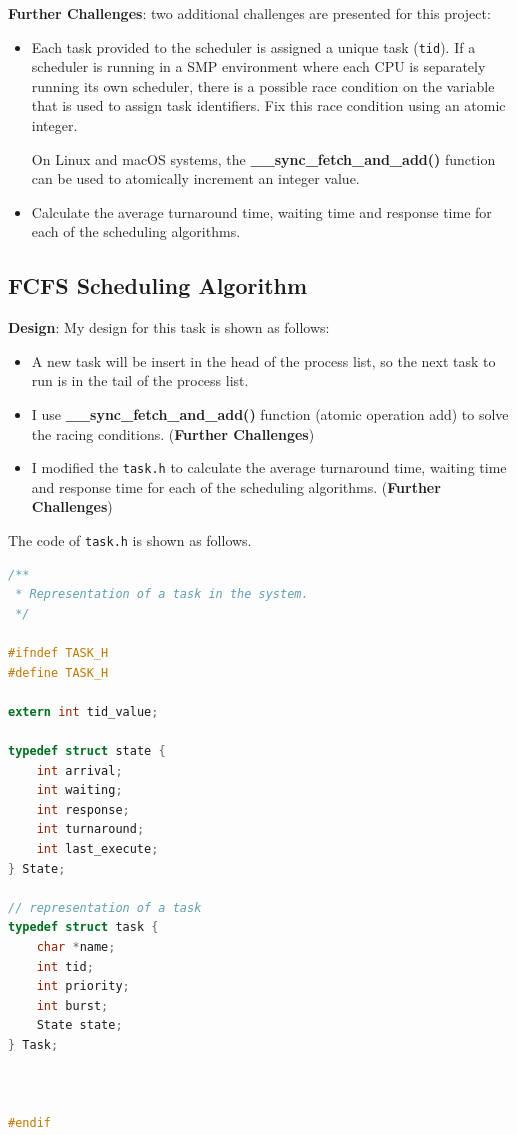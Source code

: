 \documentclass[UTF8,10pt,a4paper]{article}
\theoremstyle{Problem}
\theoremstyle{Solution}
\begin{document}
\textbf{Further Challenges}: two additional challenges are presented for this project:
\begin{itemize}
\item Each task provided to the scheduler is assigned a unique task (\texttt{tid}). If a scheduler is running in a SMP environment where each CPU is separately running its own scheduler, there is a possible race condition on the variable that is used to assign task identifiers. Fix this race condition using an atomic integer.

On Linux and macOS systems, the \textbf{\_\_sync\_fetch\_and\_add()} function
can be used to atomically increment an integer value.

\item Calculate the average turnaround time, waiting time and response time for each of the scheduling algorithms.
\end{itemize}

\subsection{FCFS Scheduling Algorithm}

\textbf{Design}: My design for this task is shown as follows:

\begin{itemize}
    \item A new task will be insert in the head of the process list, so the next task to run is in the tail of the process list.
    \item I use \textbf{\_\_sync\_fetch\_and\_add()} function (atomic operation add) to solve the racing conditions. (\textbf{Further Challenges})
    \item I modified the \texttt{task.h} to calculate the average turnaround time, waiting time and response time for each of the scheduling algorithms. (\textbf{Further Challenges})
\end{itemize}


The code of \texttt{task.h} is shown as follows.
\begin{lstlisting}[language = c]
/**
 * Representation of a task in the system.
 */

#ifndef TASK_H
#define TASK_H

extern int tid_value;

typedef struct state {
    int arrival;
    int waiting;
    int response;
    int turnaround;
    int last_execute;
} State;

// representation of a task
typedef struct task {
    char *name;
    int tid;
    int priority;
    int burst;
    State state;
} Task;



#endif
\end{lstlisting}
\end{document}
